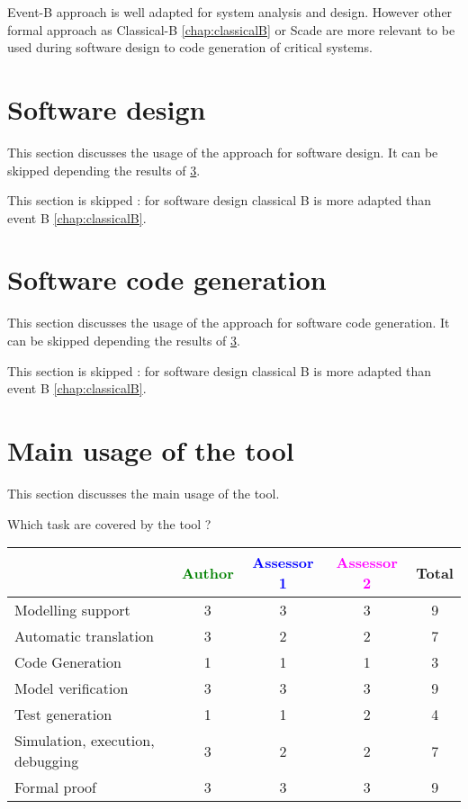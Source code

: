 \begin{author_comment}
Event-B  approach is well adapted for system analysis and design. However other formal approach as Classical-B \ref{chap:classicalB} or Scade are more relevant to be used during software design to code generation of critical systems.
\end{author_comment}


\section{Software design}
This section discusses the usage of the approach for software design.
It can be skipped depending the results of \ref{main_usage}.


\begin{author_comment}
This section is skipped :  for software design classical B is more adapted than event B \ref{chap:classicalB}.
\end{author_comment}



\section{Software code generation}
This section discusses the usage of the approach for software code generation.
It can be skipped depending the results of \ref{main_usage}.


\begin{author_comment}
This section is skipped :  for software design classical B is more adapted than event B \ref{chap:classicalB}.
\end{author_comment}




\section{Main usage of the tool}
\label{main_usage}

This section discusses the main usage of the tool.

Which task are covered by the tool ?


\begin{tabular}{|l | c | c | c | c|}
\hline
& \textcolor{green}{Author} & \textcolor{blue}{Assessor 1} & \textcolor{magenta}{Assessor 2} & Total \\
\hline 
Modelling support & 3 & 3 & 3 & 9 \\
\hline
Automatic translation  & 3 & 2 & 2 & 7 \\
\hline
Code Generation  & 1 & 1 & 1 & 3 \\
\hline
Model verification & 3 & 3 & 3 & 9 \\
\hline
Test generation & 1 & 1 & 2 & 4 \\
\hline
Simulation, execution, debugging & 3 & 2 & 2 & 7 \\
\hline
Formal proof & 3 & 3 & 3 & 9 \\
\hline
\end{tabular}

